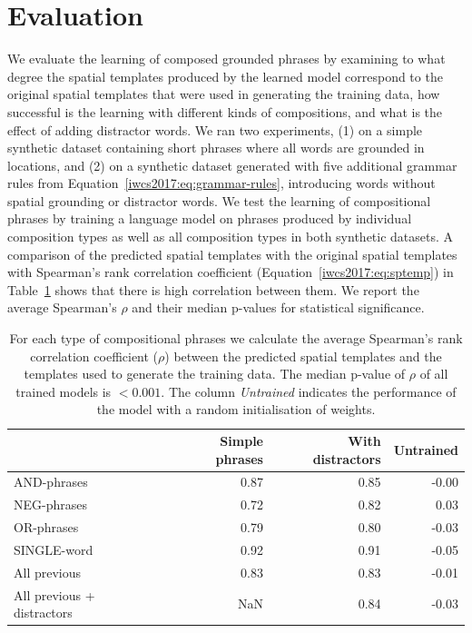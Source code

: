 \section{Evaluation}\label{iwcs2017:sec:evaluation}

We evaluate the learning of composed grounded phrases by examining to what degree the
spatial templates produced by the learned model correspond to the original
spatial templates that were used in generating the training data, how successful is the learning with
different kinds of compositions, and what is the effect of adding distractor words. We ran two
experiments, (1) on a simple synthetic dataset containing short phrases where
all words are grounded in locations, and (2) on a synthetic dataset
generated with five additional grammar rules from Equation~\ref{iwcs2017:eq:grammar-rules}, introducing
words without spatial grounding or distractor words. We test the learning of compositional phrases by training a language model on phrases produced by individual composition types as well as all composition types in both synthetic datasets. A comparison of the
predicted spatial templates with the original spatial templates with Spearman's rank
correlation coefficient (Equation~\ref{iwcs2017:eq:sptemp}) in Table~\ref{iwcs2017:tab:exp0} shows that there is high
correlation between them. We
report the average Spearman's $\rho$ and their median p-values for statistical significance.

\begin{table}[htbp]
\centering
\small
\begin{tabular}{lrrr}
\hline
 &    Simple phrases &  With distractors & Untrained \\
\hline
AND-phrases         &  0.87 &      0.85& -0.00\\
NEG-phrases         &  0.72 &      0.82&  0.03\\
OR-phrases          &  0.79 &      0.80& -0.03\\
SINGLE-word         &  0.92 &      0.91& -0.05\\
All previous               &  0.83 &      0.83& -0.01\\
All previous + distractors &  NaN  &  0.84& -0.03\\
\hline
\end{tabular}\vspace{0.5em}
\caption{\label{iwcs2017:tab:exp0} For each type of compositional phrases we calculate
the average Spearman's rank correlation coefficient ($\rho$)
between the predicted spatial templates and
the templates used to generate the training data. The median p-value of $\rho$ of all trained models
is $<0.001$. The column \emph{Untrained} indicates the performance of the model
with a random initialisation of weights.} %
\end{table}

